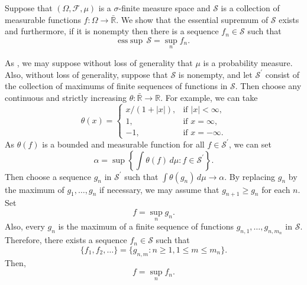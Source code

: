 \documentclass[12pt]{article}
\newcommand{\esssup}{{\mathrm{ess}\sup}}
\begin{document}

Suppose that $(\Omega,\mathcal{F},\mu)$ is a $\sigma$-finite measure space and $\mathcal{S}$ is a collection of measurable functions $f\colon\Omega\rightarrow\mathbb{\bar R}$. We show that the essential supremum of $\mathcal{S}$ exists and furthermore, if it is nonempty then there is a sequence $f_n\in\mathcal{S}$ such that
\begin{equation*}
\esssup\,\mathcal{S}=\sup_nf_n.
\end{equation*}

As , we may suppose without loss of generality that $\mu$ is a probability measure. Also, without loss of generality, suppose that $\mathcal{S}$ is nonempty, and let $\mathcal{S}^\prime$ consist of the collection of maximums of finite sequences of functions in $\mathcal{S}$. Then choose any continuous and strictly increasing $\theta\colon\mathbb{\bar R}\rightarrow\mathbb{R}$. For example, we can take
\begin{equation*}
\theta(x)=
\left\{
\begin{array}{ll}
x/(1+|x|),&\textrm{if }|x|<\infty,\\
1,&\textrm{if }x=\infty,\\
-1,&\textrm{if }x=-\infty.
\end{array}
\right.
\end{equation*}
As $\theta(f)$ is a bounded and measurable function for all $f\in\mathcal{S}^\prime$, we can set
\begin{equation*}
\alpha=\sup\left\{\int\theta(f)\,d\mu:f\in\mathcal{S}^\prime\right\}.
\end{equation*}
Then choose a sequence $g_n$ in $\mathcal{S}^\prime$ such that $\int\theta(g_n)\,d\mu\rightarrow\alpha$. By replacing $g_n$ by the maximum of $g_1,\ldots,g_n$ if necessary, we may assume that $g_{n+1}\ge g_n$ for each $n$. Set
\begin{equation*}
f=\sup_n g_n.
\end{equation*}
Also, every $g_n$ is the maximum of a finite sequence of functions $g_{n,1},\ldots,g_{n,{m_n}}$ in $\mathcal{S}$. Therefore, there exists a sequence $f_n\in\mathcal{S}$ such that
\begin{equation*}
\{f_1,f_2,\ldots\}=\{g_{n,m}:n\ge 1,1\le m\le m_n\}.
\end{equation*}
Then,
\begin{equation*}
f=\sup_nf_n.
\end{equation*}
\end{document}
